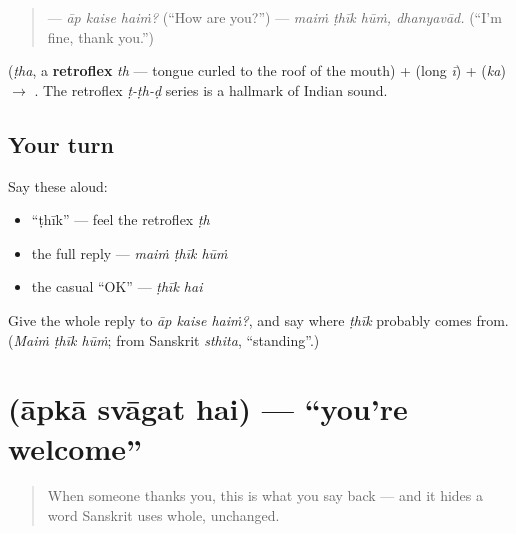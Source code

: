 \begin{quote}
— \emph{āp kaise haiṁ?} (\textquotedblleft{}How are you?\textquotedblright{}) — \emph{maiṁ ṭhīk hūṁ, dhanyavād.} (\textquotedblleft{}I'm fine, thank you.\textquotedblright{})
\end{quote}

\begin{sounds}
 (\emph{ṭha}, a \textbf{retroflex} \emph{th} — tongue curled to the roof of the mouth) +  (long \emph{ī}) +  (\emph{ka}) $\to$ . The retroflex \emph{ṭ-ṭh-ḍ} series is a hallmark of Indian sound.
\end{sounds}

\subsection*{Your turn}
Say these aloud:

\begin{itemize}
\raggedright
  \item \textquotedblleft{}ṭhīk\textquotedblright{} — feel the retroflex \emph{ṭh}
  \item the full reply — \emph{maiṁ ṭhīk hūṁ}
  \item the casual \textquotedblleft{}OK\textquotedblright{} — \emph{ṭhīk hai}
\end{itemize}

\begin{tcolorbox}[breakable,colback=teal!4,colframe=teal!35!black,title={Before you move on}]
Give the whole reply to \emph{āp kaise haiṁ?}, and say where \emph{ṭhīk} probably comes from. (\emph{Maiṁ ṭhīk hūṁ}; from Sanskrit \emph{sthita}, \textquotedblleft{}standing\textquotedblright{}.)
\end{tcolorbox}
\section[\texorpdfstring{\hi{आपका} \hi{स्वागत} \hi{है} (āpkā svāgat hai)}{आपका स्वागत है (āpkā svāgat hai)}]{   (āpkā svāgat hai) — \textquotedblleft{}you're welcome\textquotedblright{}}

\label{lesson:HI-C03-aapka-swagat-hai}



\begin{quote}
When someone thanks you, this is what you say back — and it hides a word Sanskrit uses whole, unchanged.
\end{quote}

